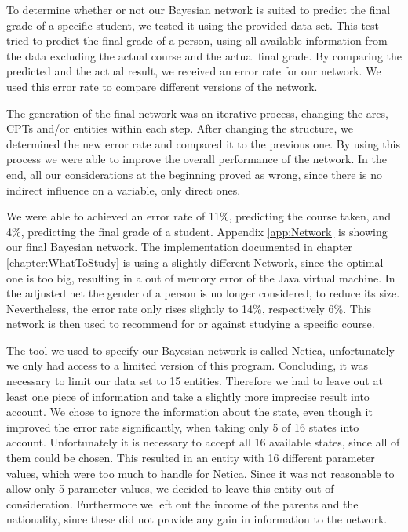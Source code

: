 \documentclass[%
	pdftex,
	oneside,        %
	11pt,           %
	parskip=half,   %
	headsepline,    %
	footsepline,    %
	abstracton,     %
	USenglish,      %
	a4paper,        %
]{report}
\begin{document}
To determine whether or not our Bayesian network is suited to predict the final grade of a specific student, we tested it using the provided data set. This test tried to predict the final grade of a person, using all available information from the data excluding the actual course and the actual final grade. By comparing the predicted and the actual result, we received an error rate for our network. We used this error rate to compare different versions of the network.

The generation of the final network was an iterative process, changing the arcs, CPTs and/or entities within each step. After changing the structure, we determined the new error rate and compared it to the previous one. By using this process we were able to improve the overall performance of the network. In the end, all our considerations at the beginning proved as wrong, since there is no indirect influence on a variable, only direct ones.

We were able to achieved an error rate of 11\%, predicting the course taken, and 4\%, predicting the final grade of a student. Appendix \vref{app:Network} is showing our final Bayesian network. The implementation documented in chapter \vref{chapter:WhatToStudy} is using a slightly different Network, since the optimal one is too big, resulting in a out of memory error of the Java virtual machine. In the adjusted net the gender of a person is no longer considered, to reduce its size. Nevertheless, the error rate only rises slightly to 14\%, respectively 6\%. This network is then used to recommend for or against studying a specific course. 

The tool we used to specify our Bayesian network is called Netica, unfortunately we only had access to a limited version of this program. Concluding, it was necessary to limit our data set to 15 entities. Therefore we had to leave out at least one piece of information and take a slightly more imprecise result into account. We chose to ignore the information about the state, even though it improved the error rate significantly, when taking only 5 of 16 states into account. Unfortunately it is necessary to accept all 16 available states, since all of them could be chosen. This resulted in an entity with 16 different parameter values, which were too much to handle for Netica. Since it was not reasonable to allow only 5 parameter values, we decided to leave this entity out of consideration. Furthermore we left out the income of the parents and the nationality, since these did not provide any gain in information to the network.
\end{document}
